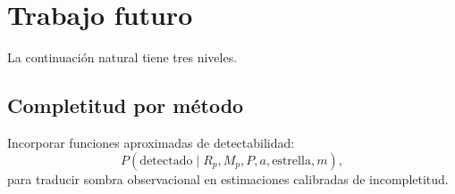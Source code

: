 \documentclass[11pt]{article}
\begin{document}
\section{Trabajo futuro}

La continuación natural tiene tres niveles.

\subsection{Completitud por método}

Incorporar funciones aproximadas de detectabilidad:
\[
P(\mathrm{detectado}\mid R_p,M_p,P,a,\mathrm{estrella},m),
\]
para traducir sombra observacional en estimaciones calibradas de incompletitud.
\end{document}
